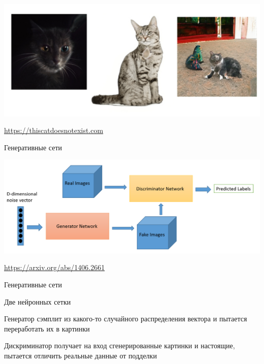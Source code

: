 \documentclass[notes,12pt, aspectratio=169]{beamer}
\newenvironment{wideitemize}{\itemize\addtolength{\itemsep}{10pt}}{\enditemize}
\begin{document}
\begin{frame}
\begin{center}
	\includegraphics[width=.9\linewidth]{cat_teaser.png}
\end{center}
\vfill
\footnotesize
{\color{blue} \url{https://thiscatdoesnotexist.com}}
\end{frame}


\begin{frame}{Генеративные сети}
\begin{center}
	\includegraphics[width=.95\linewidth]{gan1.png}
\end{center}
\vfill
\footnotesize
{\color{blue} \url{https://arxiv.org/abs/1406.2661}}
\end{frame}


\begin{frame}{Генеративные сети}
\begin{wideitemize}
	\item   Две нейронных сетки 
	\item   \alert{Генератор}  сэмплит из какого-то случайного распределения вектора и пытается переработать их в картинки 
	\item   \alert{Дискриминатор}  получает на вход сгенерированные картинки и настоящие, пытается отличить реальные данные от подделки   
\end{wideitemize}
\end{frame}
\end{document}
